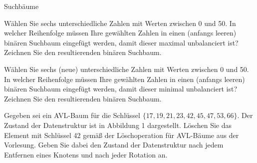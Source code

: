 \documentclass{exercisesheet}
\begin{document}
\begin{exercises}{Suchbäume}
\item Wählen Sie sechs unterschiedliche Zahlen mit Werten zwischen 0 und 50. In welcher Reihenfolge müssen Ihre gewählten Zahlen in einen (anfangs leeren) binären Suchbaum eingefügt werden, damit dieser maximal unbalanciert ist? Zeichnen Sie den resultierenden binären Suchbaum.
\item Wählen Sie sechs (neue) unterschiedliche Zahlen mit Werten zwischen 0 und 50. In welcher Reihenfolge müssen Ihre gewählten Zahlen in einen (anfangs leeren) binären Suchbaum eingefügt werden, damit dieser minimal unbalanciert ist? Zeichnen Sie den resultierenden binären Suchbaum.
\item Gegeben sei ein AVL-Baum für die Schlüssel $\{17,19,21,23,42,45,47,53,66\}$. Der Zustand der Datenstruktur ist in Abbildung 1 dargestellt. Löschen Sie das Element mit Schlüssel 42 gemäß der Löschoperation für AVL-Bäume aus der Vorlesung. Geben Sie dabei den Zustand der Datenstruktur nach jedem Entfernen eines Knotens und nach jeder Rotation an.
\end{exercises}
\end{document}
